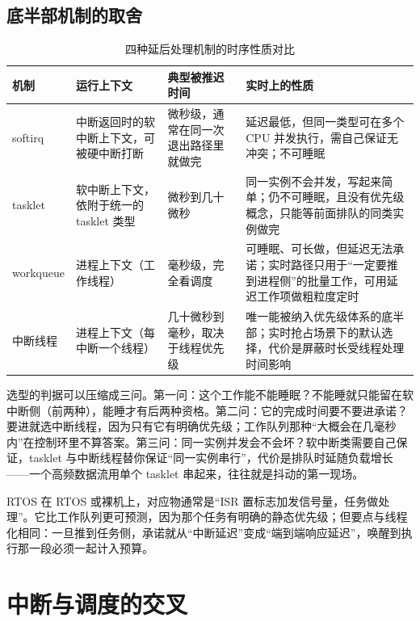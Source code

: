 \documentclass[12pt,a4paper,fontset=fandol]{ctexbook}
\newcommand{\Lang}[1]{\textsf{#1}}
\newcommand{\DomRtos}{\Lang{RTOS}}
\begin{document}
\subsection{底半部机制的取舍}

\begin{table}[htbp]
\centering
\caption{四种延后处理机制的时序性质对比}\label{tab:ch03-bh-mechanisms}
\begin{tabular}{>{\raggedright\arraybackslash}p{} >{\raggedright\arraybackslash}p{} >{\raggedright\arraybackslash}p{} >{\raggedright\arraybackslash}p{}}
\toprule
机制 & 运行上下文 & 典型被推迟时间 & 实时上的性质 \\
\midrule
softirq & 中断返回时的软中断上下文，可被硬中断打断 & 微秒级，通常在同一次退出路径里就做完 & 延迟最低，但同一类型可在多个 CPU 并发执行，需自己保证无冲突；不可睡眠 \\
\addlinespace
tasklet & 软中断上下文，依附于统一的 tasklet 类型 & 微秒到几十微秒 & 同一实例不会并发，写起来简单；仍不可睡眠，且没有优先级概念，只能等前面排队的同类实例做完 \\
\addlinespace
workqueue & 进程上下文（工作线程） & 毫秒级，完全看调度 & 可睡眠、可长做，但延迟无法承诺；实时路径只用于``一定要推到进程侧''的批量工作，可用延迟工作项做粗粒度定时 \\
\addlinespace
中断线程 & 进程上下文（每中断一个线程） & 几十微秒到毫秒，取决于线程优先级 & 唯一能被纳入优先级体系的底半部；实时抢占场景下的默认选择，代价是屏蔽时长受线程处理时间影响 \\
\bottomrule
\end{tabular}
\end{table}

选型的判据可以压缩成三问。第一问：这个工作能不能睡眠？不能睡就只能留在软中断侧（前两种），能睡才有后两种资格。第二问：它的完成时间要不要进承诺？要进就选中断线程，因为只有它有明确优先级；工作队列那种``大概会在几毫秒内''在控制环里不算答案。第三问：同一实例并发会不会坏？软中断类需要自己保证，tasklet 与中断线程替你保证``同一实例串行''，代价是排队时延随负载增长——一个高频数据流用单个 tasklet 串起来，往往就是抖动的第一现场。

\DomRtos{} 在 RTOS 或裸机上，对应物通常是``ISR 置标志加发信号量，任务做处理''。它比工作队列更可预测，因为那个任务有明确的静态优先级；但要点与线程化相同：一旦推到任务侧，承诺就从``中断延迟''变成``端到端响应延迟''，唤醒到执行那一段必须一起计入预算。

\section{中断与调度的交叉}
\label{sec:ch03-scheduling-cross}
\end{document}
